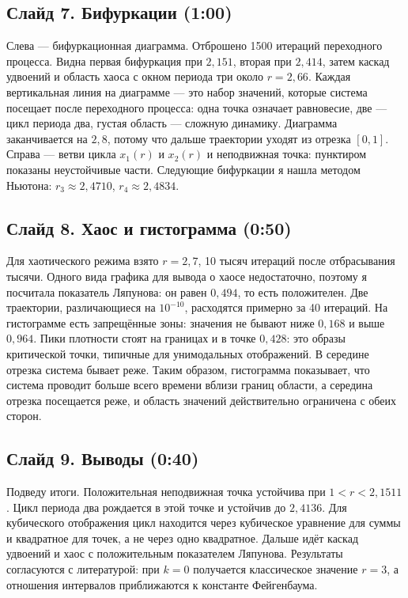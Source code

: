 \documentclass[12pt,a4paper]{article}
\begin{document}
\subsection*{Слайд 7. Бифуркации (1:00)}
Слева --- бифуркационная диаграмма. Отброшено 1500 итераций переходного процесса. Видна первая бифуркация при $2{,}151$, вторая при $2{,}414$, затем каскад удвоений и область хаоса с окном периода три около $r=2{,}66$. Каждая вертикальная линия на диаграмме --- это набор значений, которые система посещает после переходного процесса: одна точка означает равновесие, две --- цикл периода два, густая область --- сложную динамику. Диаграмма заканчивается на $2{,}8$, потому что дальше траектории уходят из отрезка $[0,1]$. Справа --- ветви цикла $x_1(r)$ и $x_2(r)$ и неподвижная точка: пунктиром показаны неустойчивые части. Следующие бифуркации я нашла методом Ньютона: $r_3\approx2{,}4710$, $r_4\approx2{,}4834$.

\subsection*{Слайд 8. Хаос и гистограмма (0:50)}
Для хаотического режима взято $r=2{,}7$, 10 тысяч итераций после отбрасывания тысячи. Одного вида графика для вывода о хаосе недостаточно, поэтому я посчитала показатель Ляпунова: он равен $0{,}494$, то есть положителен. Две траектории, различающиеся на $10^{-10}$, расходятся примерно за 40 итераций. На гистограмме есть запрещённые зоны: значения не бывают ниже $0{,}168$ и выше $0{,}964$. Пики плотности стоят на границах и в точке $0{,}428$: это образы критической точки, типичные для унимодальных отображений. В середине отрезка система бывает реже. Таким образом, гистограмма показывает, что система проводит больше всего времени вблизи границ области, а середина отрезка посещается реже, и область значений действительно ограничена с обеих сторон.

\subsection*{Слайд 9. Выводы (0:40)}
Подведу итоги. Положительная неподвижная точка устойчива при $1<r<2{,}1511$. Цикл периода два рождается в этой точке и устойчив до $2{,}4136$. Для кубического отображения цикл находится через кубическое уравнение для суммы и квадратное для точек, а не через одно квадратное. Дальше идёт каскад удвоений и хаос с положительным показателем Ляпунова. Результаты согласуются с литературой: при $k=0$ получается классическое значение $r=3$, а отношения интервалов приближаются к константе Фейгенбаума.
\end{document}

